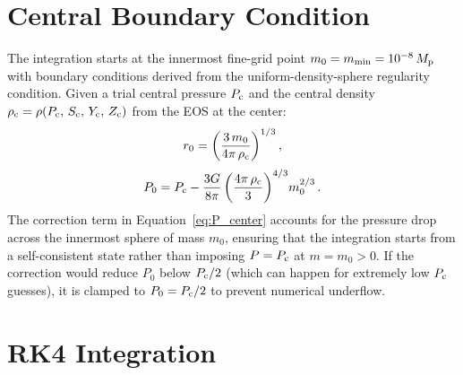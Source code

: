 \documentclass{aastex631}
\newcommand{\Mpl}{M_{\rm p}}
\newcommand{\Pc}{P_{\rm c}}
\begin{document}
\section{Central Boundary Condition}\label{sec:bc}

The integration starts at the innermost fine-grid point $m_0 = m_{\rm
min} = 10^{-8}\,\Mpl$ with boundary conditions derived from the
uniform-density-sphere regularity condition.  Given a trial central
pressure $\Pc$ and the central density $\rho_{\rm c} =
\rho(\Pc,\,S_{\rm c},\,Y_{\rm c},\,Z_{\rm c})$ from the EOS at the
center:
\begin{equation}\label{eq:r_center}
  r_0 = \left(\frac{3\,m_0}{4\pi\,\rho_{\rm c}}\right)^{1/3},
\end{equation}
\begin{equation}\label{eq:P_center}
  P_0 = \Pc - \frac{3G}{8\pi}
    \left(\frac{4\pi\,\rho_{\rm c}}{3}\right)^{4/3}\!m_0^{2/3}\,.
\end{equation}
The correction term in Equation~\eqref{eq:P_center} accounts for the
pressure drop across the innermost sphere of mass $m_0$, ensuring that
the integration starts from a self-consistent state rather than imposing
$P = \Pc$ at $m = m_0 > 0$.  If the correction would reduce $P_0$ below
$\Pc/2$ (which can happen for extremely low $\Pc$ guesses), it is
clamped to $P_0 = \Pc/2$ to prevent numerical underflow.

\section{RK4 Integration}\label{sec:rk4}
\end{document}
